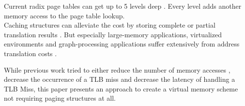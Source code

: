 Current radix page tables can get up to 5 levels deep \cite{intel5LevelPaging5Level2017}. Every level
adds another memory access to the page table lookup.\\
Caching structures can alleviate the cost by storing complete or partial translation results \cite{van2002memory}.
But especially large-memory applications, virtualized environments and graph-processing applications
suffer extensively from address translation costs \cite{zagieboylo2020cost}.





While previous work tried to either reduce the number of memory accesses ,
decrease the occurrence of a TLB miss and decrease the latency of handling a TLB Miss, this paper
presents an approach to create a virtual memory scheme not requiring paging structures at all.\\


%





